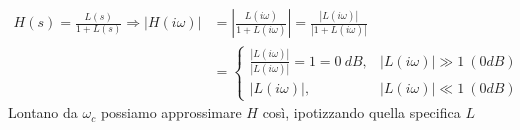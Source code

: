 \documentclass[10pt,a4paper]{book}
\begin{document}
\begin{equation*}
\begin{aligned}
H( s) =\frac{L( s)}{1+L( s)} \Rightarrow | H( i\omega )|  & =\left| \frac{L( i\omega )}{1+L( i\omega )}\right| =\frac{| L( i\omega )| }{| 1+L( i\omega )| }\\
 & =\begin{cases}
\frac{| L( i\omega )| }{| L( i\omega )| } =1=0\ \si{dB}, & | L( i\omega )| \gg 1\ ( 0 \si{dB})\\
| L( i\omega )| , & | L( i\omega )| \ll 1\ ( 0 \si{dB})
\end{cases}
\end{aligned}
\end{equation*}
Lontano da $\omega _{c}$ possiamo approssimare $H$ così, ipotizzando quella specifica $L$


\begin{figure}[htpb]\centering
{} %

\begin{tikzpicture}[x=0.75pt,y=0.75pt,yscale=-1,xscale=1]


\end{tikzpicture}
\end{figure}
\end{document}
